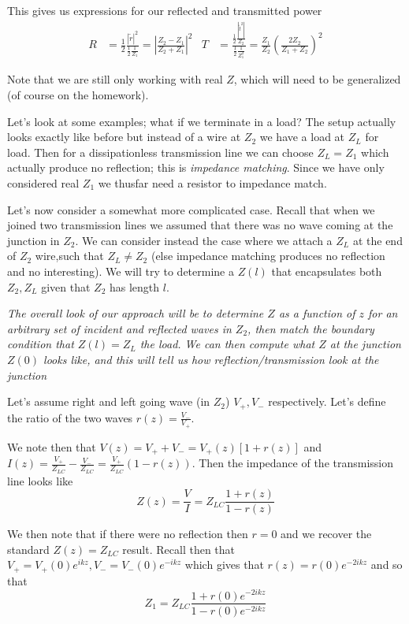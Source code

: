 \documentclass[10pt]{report}
\newcommand{\abs}[1]{\left|#1\right|}
\begin{document}
This gives us expressions for our reflected and transmitted power
\begin{align}
    R &= \frac{1}{2}\frac{\abs{\tilde{r}}^2}{\frac{1}{2}\frac{1}{Z_{1}}} = \abs{\frac{Z_2 - Z_1}{Z_2 + Z_1}}^2 & T &= \frac{\frac{1}{2}\frac{\abs{\tilde{t}^2}}{Z_2}}{\frac{1}{2}\frac{1}{Z_1^2}} = \frac{Z_1}{Z_2}\left( \frac{2Z_2}{Z_1 + Z_2} \right)^2
\end{align}

Note that we are still only working with real $Z$, which will need to be generalized (of course on the homework). 

Let's look at some examples; what if we terminate in a load? The setup actually looks exactly like before but instead of a wire at $Z_2$ we have a load at $Z_{L}$ for load. Then for a dissipationless transmission line we can choose $Z_L = Z_1$ which actually produce no reflection; this is \emph{impedance matching}. Since we have only considered real $Z_1$ we thusfar need a resistor to impedance match. 

Let's now consider a somewhat more complicated case. Recall that when we joined two transmission lines we assumed that there was no wave coming at the junction in $Z_2$. We can consider instead the case where we attach a $Z_L$ at the end of $Z_2$ wire,such that $Z_L\neq Z_2$ (else impedance matching produces no reflection and no interesting). We will try to determine a $Z(l)$ that encapsulates both $Z_2, Z_L$ given that $Z_2$ has length $l$. 

{\em \small The overall look of our approach will be to determine $Z$ as a function of $z$ for an arbitrary set of incident and reflected waves in $Z_2$, then match the boundary condition that $Z(l) = Z_L$ the load. We can then compute what $Z$ at the junction $Z(0)$ looks like, and this will tell us how reflection/transmission look at the junction}

Let's assume right and left going wave (in $Z_2$) $V_+, V_-$ respectively. Let's define the ratio of the two waves $r(z) = \frac{V_-}{V_+}$. 

We note then that $V(z) = V_+ + V_- = V_+(z)\left[ 1 + r(z) \right]$ and $I(z) = \frac{V_+}{Z_{LC}} - \frac{V_-}{Z_{LC}} = \frac{V_+}{Z_{LC}}\left( 1 - r(z) \right)$. Then the impedance of the transmission line looks like
\begin{equation}
    Z(z) = \frac{V}{I} = Z_{LC} \frac{1 + r(z)}{1 - r(z)}
\end{equation}

We then note that if there were no reflection then $r = 0$ and we recover the standard $Z(z) = Z_{LC}$ result. Recall then that $V_+ = V_+(0) e^{ikz}, V_- = V_-(0)e^{-ikz}$ which gives that $r(z) = r(0)e^{-2ikz}$ and so that
\begin{equation}
    Z_1 = Z_{LC} \frac{1 + r(0)e^{-2ikz}}{1 - r(0)e^{-2ikz}}
\end{equation}
\end{document}
